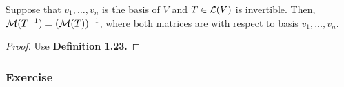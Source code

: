 \begin{proposition}
    Suppose that $v_1,\ldots,v_n$ is the basis of $V$ and $T \in \operatorname{\mathcal{L}}(V)$ is invertible. Then, 
    $\operatorname{\mathcal{M}}(T^{-1})=(\operatorname{\mathcal{M}}(T))^{-1}$, where both matrices are with respect to basis $v_1,\ldots,v_n$.
\end{proposition}


\begin{proof}
    Use \textbf{Definition 1.23.}
\end{proof}


\eject

\subsubsection{Exercise}
